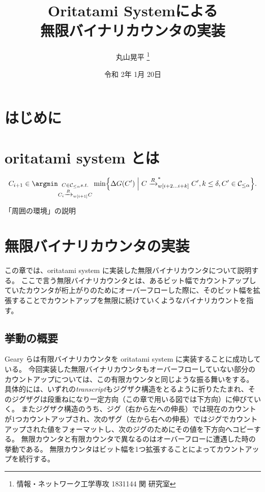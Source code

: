 \documentclass[a4j,11pt]{article}
\title{Oritatami Systemによる\\無限バイナリカウンタの実装}
\author{丸山晃平
\thanks{情報・ネットワーク工学専攻 1831144 関 研究室}
}
\date{令和 2年 1月 20日}%
\begin{document}
\maketitle

\section{はじめに}

\section{oritatami system とは}

\begin{equation}\label{eq:OS_CF}
C_{i+1} \in \argmin_{
\substack{
C \in \mathcal{C}_{\le \alpha} s.t. \\
C_i \xrightarrow{R}_{w[i+1]}C \\
}
}
\min \Bigl\{ \Delta G(C') \Bigm|
C \xrightarrow{R}^*_{w[i+2...i+k]}C', k\le \delta, C' \in \mathcal{C}_{\le \alpha}
\Bigr\}.
\end{equation}

「周囲の環境」の説明

\section{無限バイナリカウンタの実装}
この章では、oritatami system に実装した無限バイナリカウンタについて説明する。
ここで言う無限バイナリカウンタとは、あるビット幅でカウントアップしていたカウンタが桁上がりのためにオーバーフローした際に、そのビット幅を拡張することでカウントアップを無限に続けていくようなバイナリカウントを指す。

\subsection{挙動の概要}
Geary らは有限バイナリカウンタを oritatami system に実装することに成功している\cite{GeMeScSe2019}。
今回実装した無限バイナリカウンタもオーバーフローしていない部分のカウントアップについては、この有限カウンタと同じような振る舞いをする。
具体的には、いずれの\textit{transcript}もジグザク構造をとるように折りたたまれ、そのジグザグは段重ねになり一定方向（この章で用いる図では下方向）に伸びていく。
またジグザク構造のうち、ジグ（右から左への伸長）では現在のカウントが1つカウントアップされ、次のザグ（左から右への伸長）ではジグでカウントアップされた値をフォーマットし、次のジグのためにその値を下方向へコピーする。
無限カウンタと有限カウンタで異なるのはオーバーフローに遭遇した時の挙動である。
無限カウンタはビット幅を1つ拡張することによってカウントアップを続行する。
\end{document}
